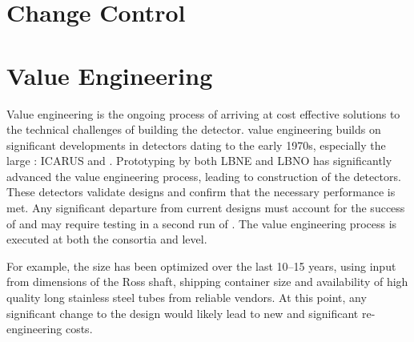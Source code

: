 \section{Change Control}
\label{sec:fdsp-change}


\section{Value Engineering}
\label{sec:fdsp-coord-ve}

Value engineering is the ongoing process of arriving at cost effective
solutions to the technical challenges of building the 
detector.  value engineering builds on significant
developments in  detectors dating to the early 1970s,
especially the large : ICARUS and
. Prototyping by both LBNE and LBNO has
significantly advanced the value engineering process, leading to
construction of the  detectors. These detectors validate
 designs and confirm that the necessary performance is
met. Any significant departure from current designs must account for
the success of  and may require testing in a second
run of . The value engineering process is executed at
both the consortia and  level.

For example, the  size has been optimized over the last 10--15 years,
using input from dimensions of the Ross shaft, shipping container size
and availability of high quality long stainless steel tubes from reliable vendors.
At this point, any significant change to the  design would likely
lead to new and significant re-engineering costs.



